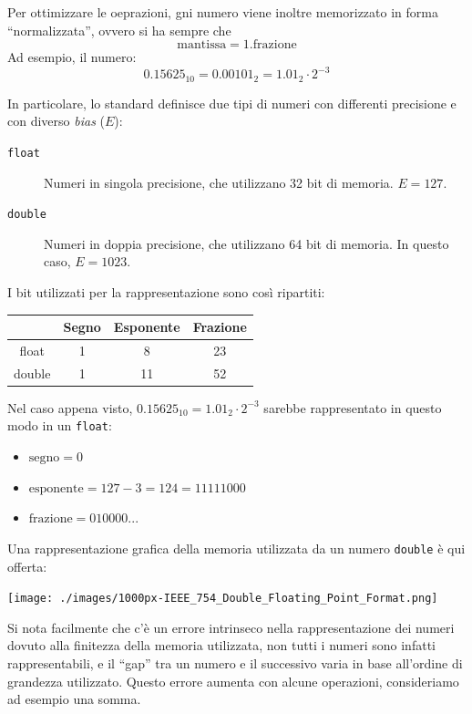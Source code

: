 \documentclass[a4paper,10pt]{article}
\begin{document}
Per ottimizzare le oeprazioni, gni numero viene inoltre memorizzato in forma ``normalizzata'', ovvero si ha sempre che
$$\text{mantissa} = 1.\text{frazione}$$
Ad esempio, il numero:
$$0.15625_{10} = 0.00101_2 = 1.01_2 \cdot 2^{-3}$$

In particolare, lo standard definisce due tipi di numeri con differenti precisione e con diverso \textit{bias} ($E$):
\begin{description}
 \item[\texttt{float}] Numeri in singola precisione, che utilizzano 32 bit di memoria. $E = 127$.
 \item[\texttt{double}] Numeri in doppia precisione, che utilizzano 64 bit di memoria. In questo caso, $E=1023$.
\end{description}
I bit utilizzati per la rappresentazione sono così ripartiti:
\begin{center}
\begin{tabular}[center]{c|c|c|c}
 & Segno & Esponente & Frazione \\ 
\hline
float & 1 & 8 & 23\\
\hline
double & 1 & 11 & 52 \\
\end{tabular}
\end{center}

Nel caso appena visto, $0.15625_{10} = 1.01_2 \cdot 2^{-3}$ sarebbe rappresentato in questo modo in un \texttt{float}:
\begin{itemize}
\item $\text{segno}=0$
\item $\text{esponente}=127-3=124=11111000$
\item $\text{frazione}=010000...$
\end{itemize}
Una rappresentazione grafica della memoria utilizzata da un numero \texttt{double} è qui offerta:

\begin{center}
 \texttt{[image: ./images/1000px-IEEE\_754\_Double\_Floating\_Point\_Format.png]}
\end{center}
Si nota facilmente che c'è un errore intrinseco nella rappresentazione dei numeri dovuto alla finitezza della memoria utilizzata, non tutti i numeri sono infatti rappresentabili, e il ``gap'' tra un numero e il successivo varia in base all'ordine di grandezza utilizzato. Questo errore aumenta con alcune operazioni, consideriamo ad esempio una somma.
\end{document}
